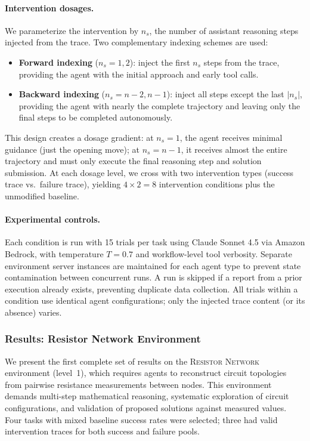 \paragraph{Intervention dosages.}
We parameterize the intervention by $n_s$, the number of assistant reasoning steps injected from the trace.
Two complementary indexing schemes are used:
\begin{itemize}
    \item \textbf{Forward indexing} ($n_s = 1, 2$): inject the first $n_s$ steps from the trace, providing the agent with the initial approach and early tool calls.
    \item \textbf{Backward indexing} ($n_s = n{-}2, n{-}1$): inject all steps except the last $|n_s|$, providing the agent with nearly the complete trajectory and leaving only the final steps to be completed autonomously.
\end{itemize}
This design creates a dosage gradient: at $n_s{=}1$, the agent receives minimal guidance (just the opening move); at $n_s{=}n{-}1$, it receives almost the entire trajectory and must only execute the final reasoning step and solution submission.
At each dosage level, we cross with two intervention types (success trace vs.\ failure trace), yielding $4 \times 2 = 8$ intervention conditions plus the unmodified baseline.

\paragraph{Experimental controls.}
Each condition is run with 15 trials per task using Claude Sonnet 4.5 via Amazon Bedrock, with temperature $T{=}0.7$ and workflow-level tool verbosity.
Separate environment server instances are maintained for each agent type to prevent state contamination between concurrent runs.
A run is skipped if a report from a prior execution already exists, preventing duplicate data collection.
All trials within a condition use identical agent configurations; only the injected trace content (or its absence) varies.

\subsubsection{Results: Resistor Network Environment}

We present the first complete set of results on the \textsc{Resistor Network} environment (level~1), which requires agents to reconstruct circuit topologies from pairwise resistance measurements between nodes.
This environment demands multi-step mathematical reasoning, systematic exploration of circuit configurations, and validation of proposed solutions against measured values.
Four tasks with mixed baseline success rates were selected; three had valid intervention traces for both success and failure pools.

